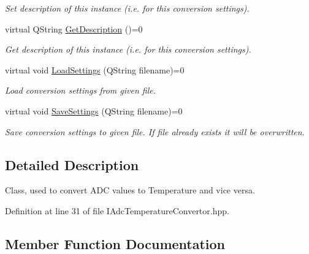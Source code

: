 \begin{DoxyCompactItemize}
\begin{DoxyCompactList}\small\item\em Set description of this instance (i.\+e. for this conversion settings). \end{DoxyCompactList}\item 
virtual Q\+String \hyperlink{class_interfaces_1_1_i_adc_temperature_convertor_a2f3b59be793c3ed43e880ef12e9749bc}{Get\+Description} ()=0
\begin{DoxyCompactList}\small\item\em Get description of this instance (i.\+e. for this conversion settings). \end{DoxyCompactList}\item 
virtual void \hyperlink{class_interfaces_1_1_i_adc_temperature_convertor_a9697a0319f82ebd1fc20f5e24d3b191c}{Load\+Settings} (Q\+String filename)=0
\begin{DoxyCompactList}\small\item\em Load conversion settings from given file. \end{DoxyCompactList}\item 
virtual void \hyperlink{class_interfaces_1_1_i_adc_temperature_convertor_a6631e979e067ab78d3e5c337449876ac}{Save\+Settings} (Q\+String filename)=0
\begin{DoxyCompactList}\small\item\em Save conversion settings to given file. If file already exists it will be overwritten. \end{DoxyCompactList}\end{DoxyCompactItemize}


\subsection{Detailed Description}
Class, used to convert A\+DC values to Temperature and vice versa. 

Definition at line 31 of file I\+Adc\+Temperature\+Convertor.\+hpp.



\subsection{Member Function Documentation}
\mbox{\label{class_interfaces_1_1_i_adc_temperature_convertor_aa6283c62cbbb012954b5e51d7a969385}} 
